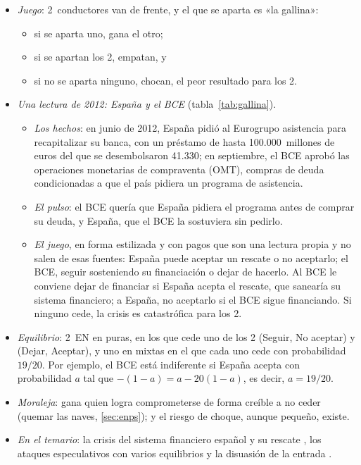 \documentclass[11pt]{article}
\begin{document}
\begin{itemize}
\item \emph{Juego}: 2~conductores van de frente, y el que se aparta es «la gallina»:
  \begin{itemize}
  \item si se aparta uno, gana el otro;
  \item si se apartan los 2, empatan, y
  \item si no se aparta ninguno, chocan, el peor resultado para los 2.
  \end{itemize}
\item \emph{Una lectura de 2012: España y el BCE} (tabla~\ref{tab:gallina})\nocite{MEDE2026Espana,BCE2012OMT}.
  \begin{itemize}
  \item \emph{Los hechos}: en junio de 2012, España pidió al Eurogrupo asistencia para recapitalizar su banca, con un préstamo de hasta 100.000~millones de euros del que se desembolsaron 41.330\nocite{MEDE2026Espana}; en septiembre, el BCE aprobó las operaciones monetarias de compraventa (OMT), compras de deuda condicionadas a que el país pidiera un programa de asistencia\nocite{BCE2012OMT}.
  \item \emph{El pulso}: el BCE quería que España pidiera el programa antes de comprar su deuda, y España, que el BCE la sostuviera sin pedirlo.
  \item \emph{El juego}, en forma estilizada y con pagos que son una lectura propia y no salen de esas fuentes: España puede aceptar un rescate o no aceptarlo; el BCE, seguir sosteniendo su financiación o dejar de hacerlo. Al BCE le conviene dejar de financiar si España acepta el rescate, que sanearía su sistema financiero; a España, no aceptarlo si el BCE sigue financiando. Si ninguno cede, la crisis es catastrófica para los 2.
  \end{itemize}
\item \emph{Equilibrio}: 2~EN en puras, en los que cede uno de los 2 (Seguir, No aceptar) y (Dejar, Aceptar), y uno en mixtas en el que cada uno cede con probabilidad $19/20$. Por ejemplo, el BCE está indiferente si España acepta con probabilidad $a$ tal que $-(1-a)=a-20(1-a)$, es decir, $a=19/20$.
\item \emph{Moraleja}: gana quien logra comprometerse de forma creíble a no ceder (quemar las naves, \ref{sec:enps}); y el riesgo de choque, aunque pequeño, existe.
\item \emph{En el temario}: la crisis del sistema financiero español y su rescate , los ataques especulativos con varios equilibrios  y la disuasión de la entrada .
\end{itemize}
\end{document}
